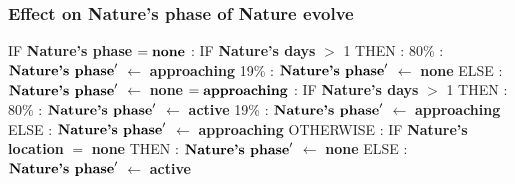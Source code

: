 \documentclass{article}%
\begin{document}
\subsubsection{Effect on Nature's phase of Nature evolve}%
\label{ssubsec:Effect on Nature's phase of Nature evolve}%
\begin{flushleft}%
IF %
\textbf{Nature's phase}%
\linebreak%
\hspace*{2em}%
$= \mbox{\textbf{none}}$%
: %
IF %
\textbf{Nature's days}%
$>$%
1%
\linebreak%
\hspace*{4em}%
THEN %
: %
\linebreak%
\hspace*{6em}%
80\%%
: %
$\mbox{\textbf{Nature's phase}} '$%
$\leftarrow$%
\textbf{approaching}%
\linebreak%
\hspace*{6em}%
19\%%
: %
$\mbox{\textbf{Nature's phase}} '$%
$\leftarrow$%
\textbf{none}%
\linebreak%
\hspace*{4em}%
ELSE %
: %
$\mbox{\textbf{Nature's phase}} '$%
$\leftarrow$%
\textbf{none}%
\linebreak%
\hspace*{2em}%
$= \mbox{\textbf{approaching}}$%
: %
IF %
\textbf{Nature's days}%
$>$%
1%
\linebreak%
\hspace*{4em}%
THEN %
: %
\linebreak%
\hspace*{6em}%
80\%%
: %
$\mbox{\textbf{Nature's phase}} '$%
$\leftarrow$%
\textbf{active}%
\linebreak%
\hspace*{6em}%
19\%%
: %
$\mbox{\textbf{Nature's phase}} '$%
$\leftarrow$%
\textbf{approaching}%
\linebreak%
\hspace*{4em}%
ELSE %
: %
$\mbox{\textbf{Nature's phase}} '$%
$\leftarrow$%
\textbf{approaching}%
\linebreak%
\hspace*{2em}%
OTHERWISE %
: %
IF %
\textbf{Nature's location}%
$=$%
\textbf{none}%
\linebreak%
\hspace*{4em}%
THEN %
: %
$\mbox{\textbf{Nature's phase}} '$%
$\leftarrow$%
\textbf{none}%
\linebreak%
\hspace*{4em}%
ELSE %
: %
$\mbox{\textbf{Nature's phase}} '$%
$\leftarrow$%
\textbf{active}%
\end{flushleft}
\end{document}
